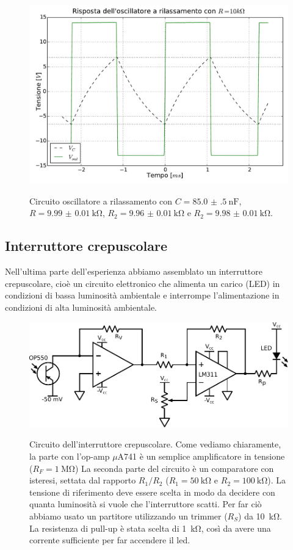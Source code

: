 \begin{figure}[ht]
 \centering
   {\includegraphics[width=14.5cm]{../E04/latex/osc10k.pdf}}
 \caption{Circuito oscillatore a rilassamento con $C=\SI{85.0(5)}{\nano\farad}$, $R=\SI{9.99(1)}{\kohm}$, $R_2= \SI{9.96(1)}{\kohm}$ e $R_2=\SI{9.98(1)}{\kohm}$.}
 \label{gr4:osc10k}
\end{figure}

\subsection{Interruttore crepuscolare}

Nell'ultima parte dell'esperienza abbiamo assemblato un interruttore crepuscolare, cioè un circuito elettronico che alimenta un carico (LED) in condizioni di bassa luminosità ambientale e interrompe l'alimentazione in condizioni di alta luminosità ambientale.

\begin{figure}[ht]
 \centering
   {\includegraphics[width=12.5cm]{../E04/latex/c_crepuscolare.pdf}}
 \caption{Circuito dell'interruttore crepuscolare. Come vediamo chiaramente, la parte con l'op-amp $\mu$A741 è un semplice amplificatore in tensione ($R_F = \SI{1}{\Mohm}$) La seconda parte del circuito è un comparatore con isteresi, settata dal rapporto $R_1/R_2$ ($R_1 = \SI{50}{\kohm}$ e $R_2 = \SI{100}{\kohm}$). La tensione di riferimento deve essere scelta in modo da decidere con quanta luminosità si vuole che l'interruttore scatti. Per far ciò abbiamo usato un partitore utilizzando un trimmer ($R_S$) da \SI{10}{\kohm}. La resistenza di pull-up è stata scelta di  \SI{1}{\kohm}, così da avere una corrente sufficiente per far accendere il led.}
 \label{cir4:crepuscolare}
\end{figure}

